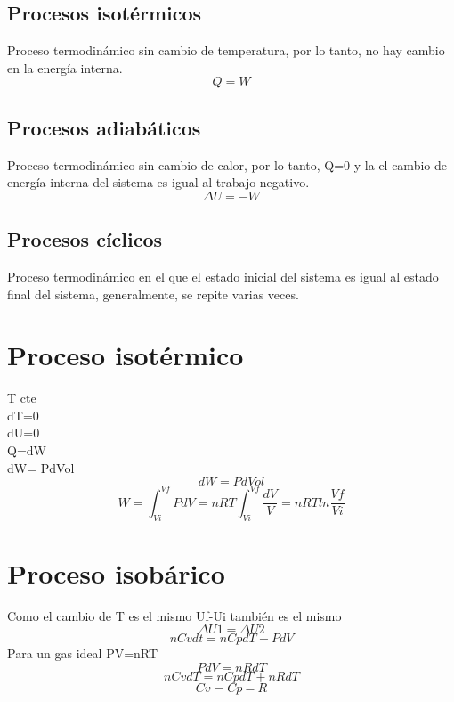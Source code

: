 \documentclass[12pt]{article}
\begin{document}
\subsection{Procesos isotérmicos}
Proceso termodinámico sin cambio de temperatura, por lo tanto, no hay cambio en la energía interna.
\begin{equation}
 Q=W
\end{equation}
\subsection{Procesos adiabáticos}
Proceso termodinámico sin cambio de calor, por lo tanto, Q=0 y la el cambio de energía interna del sistema es igual al trabajo negativo.
\begin{equation}
 \Delta U=-W
\end{equation}
\subsection{Procesos cíclicos}
Proceso termodinámico en el que el estado inicial del sistema es igual al estado final del sistema, generalmente, se repite varias veces.
\section{Proceso isotérmico}
T cte \\dT=0\\ dU=0\\ 
Q=dW\\
dW= PdVol\\
\begin{equation}
 dW=PdVol
\end{equation}
\begin{equation}
W=\int_{Vi}^{Vf} PdV = nRT\int_{Vi}^{Vf} \frac{dV}{V}= nRT  ln  \frac{Vf}{Vi}
\end{equation}

\section{Proceso isobárico}
Como el cambio de T es el mismo Uf-Ui también es el mismo
\begin{equation}
 \Delta U1=\Delta U2
\end{equation}
\begin{equation}
 nCvdt = nCpdT -PdV
\end{equation}
Para un gas ideal PV=nRT
\begin{equation}
 PdV=nRdT
\end{equation}
\begin{equation}
 nCvdT= nCpdT + nRdT
\end{equation}
\begin{equation}
 Cv= Cp-R
\end{equation}
\end{document}
